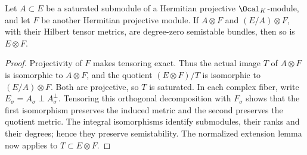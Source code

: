 \begin{lemma}
\label{lem:normalized-tensor-extension}
\leanok
Let $A\subset E$ be a saturated submodule of a Hermitian projective
$\Ocal_K$-module, and let $F$ be another Hermitian projective module.
If $A\otimes F$ and $(E/A)\otimes F$, with their Hilbert tensor metrics,
are degree-zero semistable bundles, then so is $E\otimes F$.
\end{lemma}
\begin{proof}
Projectivity of $F$ makes tensoring exact. Thus the actual image
$T$ of $A\otimes F$ is isomorphic to $A\otimes F$, and the quotient
$(E\otimes F)/T$ is isomorphic to $(E/A)\otimes F$.
Both are projective, so $T$ is saturated. In each complex fiber,
write $E_\sigma=A_\sigma\mathbin{\perp}A_\sigma^\perp$. Tensoring
this orthogonal decomposition with $F_\sigma$ shows that the first
isomorphism preserves the induced metric and the second preserves
the quotient metric. The integral isomorphisms identify submodules,
their ranks and their degrees; hence they preserve semistability.
The normalized extension lemma now applies to $T\subset E\otimes F$.
\end{proof}

